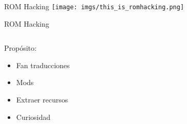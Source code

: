 \begin{frame}{ROM Hacking}
    \texttt{[image: imgs/this\_is\_romhacking.png]}
\end{frame}

\begin{frame}{ROM Hacking}
    \begin{columns}
    \begin{column}{0.35\textwidth}
        Propósito:
        \begin{itemize}
            \item<2-> Fan traducciones
            \item<3-> Mods
            \item<4-> Extraer recursos
            \item<5-> Curiosidad
        \end{itemize}
    \end{column}
    \begin{column}{0.65\textwidth}
        \centering
    \end{column}
    \end{columns}
\end{frame}

